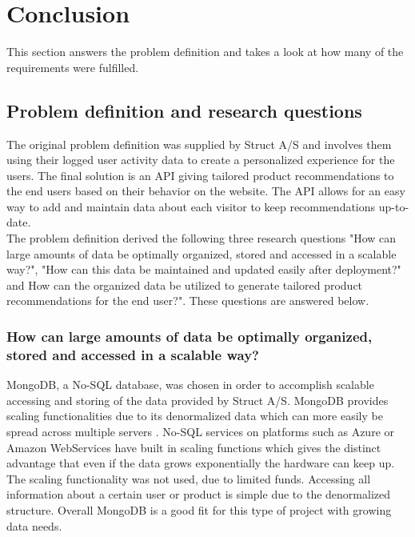 
\chapter{Conclusion} %

\label{Chapter8} %


This section answers the problem definition and takes a look at how many of the requirements were fulfilled.

\section{Problem definition and research questions}

The original problem definition was supplied by Struct A/S and involves them using their logged user activity data to create a personalized experience for the users. The final solution is an API giving tailored product recommendations to the end users based on their behavior on the website. The API allows for an easy way to add and maintain data about each visitor to keep recommendations up-to-date. \\
The problem definition derived the following three research questions "How can large amounts of data be optimally organized, stored and accessed in a scalable way?",  "How can this data be maintained and updated easily after deployment?" and How can the organized data be utilized to generate tailored product recommendations for the end user?". These questions are answered below.

\subsection{How can large amounts of data be optimally organized, stored and accessed in a scalable way?}
MongoDB, a No-SQL database, was chosen in order to accomplish scalable accessing and storing of the data provided by Struct A/S. MongoDB provides scaling functionalities due to its denormalized data which can more easily be spread across multiple servers \cite{SQLvsNOSQL}. No-SQL services on platforms such as Azure or Amazon WebServices have built in scaling functions \cite{azureNoSQL} which gives the distinct advantage that even if the data grows exponentially the hardware can keep up. The scaling functionality was not used, due to limited funds. Accessing all information about a certain user or product is simple due to the denormalized structure. Overall MongoDB is a good fit for this type of project with growing data needs.

